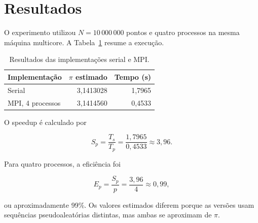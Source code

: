 \section{Resultados}

O experimento utilizou $N=10\,000\,000$ pontos e quatro processos na mesma
máquina multicore. A Tabela~\ref{tab:resultados} resume a execução.

\begin{table}[H]
    \centering
    \caption{Resultados das implementações serial e MPI.}
    \label{tab:resultados}
    \begin{tabular}{lrr}
        \toprule
        Implementação & $\pi$ estimado & Tempo (s) \\
        \midrule
        Serial & 3,1413028 & 1,7965 \\
        MPI, 4 processos & 3,1414560 & 0,4533 \\
        \bottomrule
    \end{tabular}
\end{table}

O speedup é calculado por

\begin{equation}
    S_p=\frac{T_s}{T_p}
       =\frac{1{,}7965}{0{,}4533}
       \approx 3{,}96.
\end{equation}

Para quatro processos, a eficiência foi

\begin{equation}
    E_p=\frac{S_p}{p}=\frac{3{,}96}{4}\approx 0{,}99,
\end{equation}

ou aproximadamente 99\%. Os valores estimados diferem porque as versões usam
sequências pseudoaleatórias distintas, mas ambas se aproximam de $\pi$.
